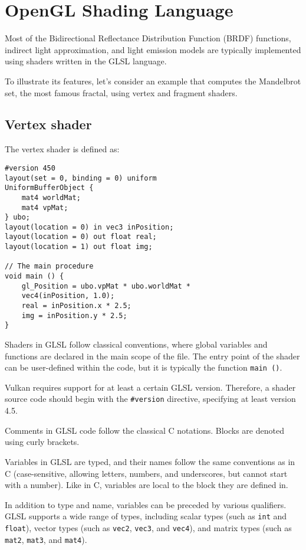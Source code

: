 \section{OpenGL Shading Language}

Most of the Bidirectional Reflectance Distribution Function (BRDF) functions, indirect light approximation, and light emission models are typically implemented using shaders written in the GLSL language.

To illustrate its features, let's consider an example that computes the Mandelbrot set, the most famous fractal, using vertex and fragment shaders.

\subsection{Vertex shader}
The vertex shader is defined as: 
\begin{verbatim}
#version 450
layout(set = 0, binding = 0) uniform
UniformBufferObject {
    mat4 worldMat;
    mat4 vpMat;
} ubo;
layout(location = 0) in vec3 inPosition;
layout(location = 0) out float real;
layout(location = 1) out float img;

// The main procedure
void main () {
    gl_Position = ubo.vpMat * ubo.worldMat *
    vec4(inPosition, 1.0);
    real = inPosition.x * 2.5;
    img = inPosition.y * 2.5;
}
\end{verbatim}
Shaders in GLSL follow classical conventions, where global variables and functions are declared in the main scope of the file. 
The entry point of the shader can be user-defined within the code, but it is typically the function \texttt{main ()}.

Vulkan requires support for at least a certain GLSL version. Therefore, a shader source code should begin with the \texttt{\#version} directive, specifying at least version 4.5.

Comments in GLSL code follow the classical C notations. 
Blocks are denoted using curly brackets. 

Variables in GLSL are typed, and their names follow the same conventions as in C (case-sensitive, allowing letters, numbers, and underscores, but cannot start with a number). 
Like in C, variables are local to the block they are defined in.

In addition to type and name, variables can be preceded by various qualifiers. 
GLSL supports a wide range of types, including scalar types (such as \texttt{int} and \texttt{float}), vector types (such as \texttt{vec2}, \texttt{vec3}, and \texttt{vec4}), and matrix types (such as \texttt{mat2}, \texttt{mat3}, and \texttt{mat4}).


